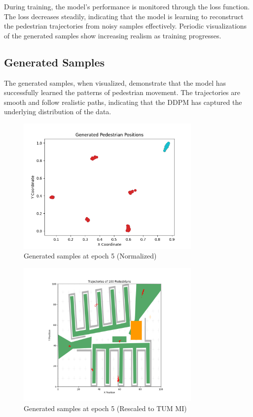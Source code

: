 \documentclass[10pt,a4paper]{article}
\begin{document}
During training, the model's performance is monitored through the loss function. The loss decreases steadily, indicating that the model is learning to reconstruct the pedestrian trajectories from noisy samples effectively. Periodic visualizations of the generated samples show increasing realism as training progresses.

\subsection*{Generated Samples}

The generated samples, when visualized, demonstrate that the model has successfully learned the patterns of pedestrian movement. The trajectories are smooth and follow realistic paths, indicating that the DDPM has captured the underlying distribution of the data.


\begin{figure}[H]
    \centering
    \includegraphics[width=0.8\textwidth]{Images/nomalized_epoch5.png}
    \caption{Generated samples at epoch 5 (Normalized)}
    \label{fig:epoch5_norm}
\end{figure}

\begin{figure}[H]
    \centering
    \includegraphics[width=0.8\textwidth]{Images/pedestrians_trajectories_epoch5.png}
    \caption{Generated samples at epoch 5 (Rescaled to TUM MI)}
    \label{fig:epoch5_real}
\end{figure}
\end{document}
